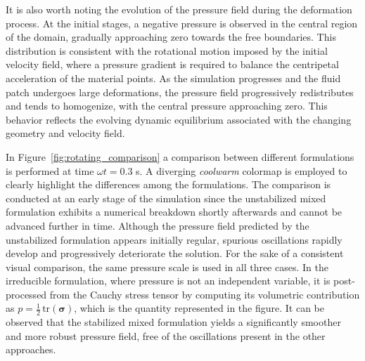 \documentclass[11pt,english]{article}
\begin{document}
    \noindent It is also worth noting the evolution of the pressure field during the deformation process. At the initial stages, a negative pressure is observed in the central region of the domain, gradually approaching zero towards the free boundaries. This distribution is consistent with the rotational motion imposed by the initial velocity field, where a pressure gradient is required to balance the centripetal acceleration of the material points. As the simulation progresses and the fluid patch undergoes large deformations, the pressure field progressively redistributes and tends to homogenize, with the central pressure approaching zero. This behavior reflects the evolving dynamic equilibrium associated with the changing geometry and velocity field.
    

     In Figure~\ref{fig:rotating_comparison} a comparison between different formulations is performed at time $\omega t = 0.3$ s. A diverging \textit{coolwarm} colormap is employed to clearly highlight the differences among the formulations. The comparison is conducted at an early stage of the simulation since the unstabilized mixed formulation exhibits a numerical breakdown shortly afterwards and cannot be advanced further in time. Although the pressure field predicted by the unstabilized formulation appears initially regular, spurious oscillations rapidly develop and progressively deteriorate the solution. For the sake of a consistent visual comparison, the same pressure scale is used in all three cases. In the irreducible formulation, where pressure is not an independent variable, it is post-processed from the Cauchy stress tensor by computing its volumetric contribution as $p = \frac{1}{2}\,\mathrm{tr}(\boldsymbol{\sigma})$, which is the quantity represented in the figure. It can be observed that the stabilized mixed formulation yields a significantly smoother and more robust pressure field, free of the oscillations present in the other approaches.
\end{document}
